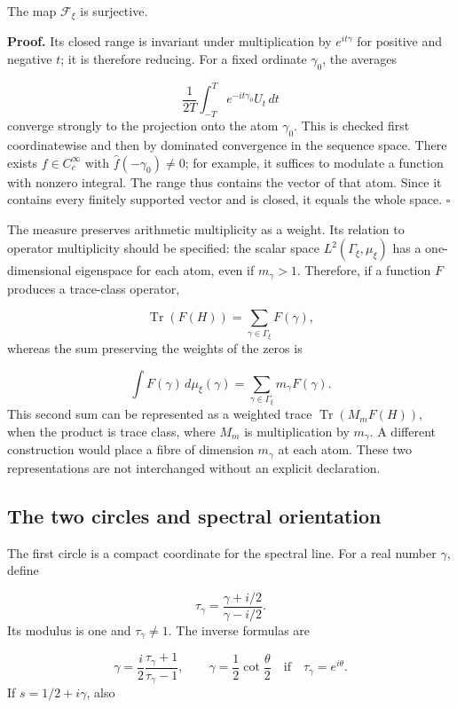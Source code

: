 The map \(\mathcal F_\xi\) is surjective.

\textbf{Proof.} Its closed range is invariant under multiplication by \(e^{it\gamma}\) for positive and negative \(t\); it is therefore reducing. For a fixed ordinate \(\gamma_0\), the averages

\[
\frac1{2T}\int_{-T}^T e^{-it\gamma_0}U_t\,dt
\]
converge strongly to the projection onto the atom \(\gamma_0\). This is checked first coordinatewise and then by dominated convergence in the sequence space. There exists \(f\in C_c^\infty\) with \(\widehat f(-\gamma_0)\neq0\); for example, it suffices to modulate a function with nonzero integral. The range thus contains the vector of that atom. Since it contains every finitely supported vector and is closed, it equals the whole space. \hfill\(\square\)

The measure preserves arithmetic multiplicity as a weight. Its relation to operator multiplicity should be specified: the scalar space \(L^2(\Gamma_\xi,\mu_\xi)\) has a one-dimensional eigenspace for each atom, even if \(m_\gamma>1\). Therefore, if a function \(F\) produces a trace-class operator,

\[
\operatorname{Tr}(F(H))=\sum_{\gamma\in\Gamma_\xi}F(\gamma),
\]
whereas the sum preserving the weights of the zeros is

\[
\int F(\gamma)\,d\mu_\xi(\gamma)
=\sum_{\gamma\in\Gamma_\xi}m_\gamma F(\gamma).
\]
This second sum can be represented as a weighted trace \(\operatorname{Tr}(M_mF(H))\), when the product is trace class, where \(M_m\) is multiplication by \(m_\gamma\). A different construction would place a fibre of dimension \(m_\gamma\) at each atom. These two representations are not interchanged without an explicit declaration.

\subsection{The two circles and spectral orientation}
\label{viii:rz:circulos}
The first circle is a compact coordinate for the spectral line. For a real number \(\gamma\), define

\[
\tau_\gamma=\frac{\gamma+i/2}{\gamma-i/2}.
\]
Its modulus is one and \(\tau_\gamma\neq1\). The inverse formulas are

\[
\gamma=\frac{i}{2}\frac{\tau_\gamma+1}{\tau_\gamma-1},
\qquad
\gamma=\frac12\cot\frac{\theta}{2}
\quad\text{if}\quad\tau_\gamma=e^{i\theta}.
\]
If \(s=1/2+i\gamma\), also


